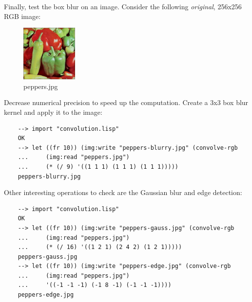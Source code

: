 Finally, test the box blur on an image. Consider the following \textit{original}, 256x256 RGB image:

\begin{figure}[h!]
    \caption{peppers.jpg}
    \centering
    \includegraphics[width=0.25\textwidth]{figures/peppers.jpg}
\end{figure}

Decrease numerical precision to speed up the computation. Create a 3x3 box blur kernel and apply it to the image:

\begin{Verbatim}
    --> import "convolution.lisp"
    OK
    --> let ((fr 10)) (img:write "peppers-blurry.jpg" (convolve-rgb
    ...     (img:read "peppers.jpg")
    ...     (* (/ 9) '((1 1 1) (1 1 1) (1 1 1)))))
    peppers-blurry.jpg
\end{Verbatim}

Other interesting operations to check are the Gaussian blur and edge detection:

\begin{Verbatim}
    --> import "convolution.lisp"
    OK
    --> let ((fr 10)) (img:write "peppers-gauss.jpg" (convolve-rgb
    ...     (img:read "peppers.jpg")
    ...     (* (/ 16) '((1 2 1) (2 4 2) (1 2 1)))))
    peppers-gauss.jpg
    --> let ((fr 10)) (img:write "peppers-edge.jpg" (convolve-rgb
    ...     (img:read "peppers.jpg")
    ...     '((-1 -1 -1) (-1 8 -1) (-1 -1 -1))))
    peppers-edge.jpg
\end{Verbatim}

